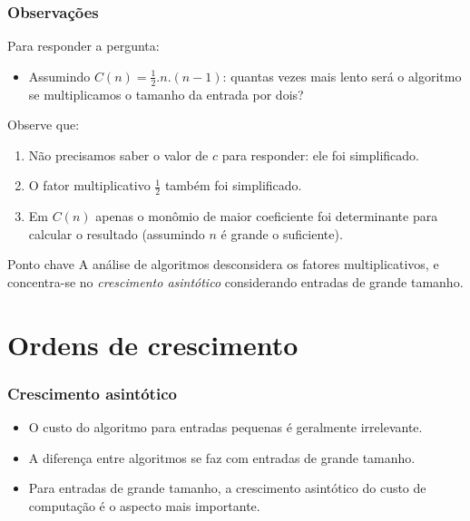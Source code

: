 \documentclass[handout]{beamer}
\begin{document}
\begin{frame}
  \frametitle{Observações}

  Para responder a pergunta:
  \begin{itemize}
  \item Assumindo $C(n) = \frac{1}{2}.n.(n-1)$: quantas vezes mais lento será o
    algoritmo se multiplicamos o tamanho da entrada por dois?
  \end{itemize}
  \pause
  Observe que:
  \begin{enumerate}
  \item Não precisamos saber o valor de $c$ para responder: ele foi
    simplificado.
  \item O fator multiplicativo $\frac{1}{2}$ também foi simplificado.
  \item Em $C(n)$ apenas o monômio de maior coeficiente foi determinante para
    calcular o resultado (assumindo $n$ é grande o suficiente).
  \end{enumerate}
  \begin{block}{Ponto chave}
    A análise de algoritmos desconsidera os fatores multiplicativos, e
    concentra-se no \emph{crescimento asintótico} considerando entradas de
    grande tamanho.
  \end{block}
\end{frame}

\section{Ordens de crescimento}

\begin{frame}
\frametitle{Crescimento asintótico}

\begin{itemize}
  \item O custo do algoritmo para entradas pequenas é geralmente irrelevante.
  \item A diferença entre algoritmos se faz com entradas de grande tamanho.
  \item Para entradas de grande tamanho, a crescimento asintótico do custo
    de computação é o aspecto mais importante.
\end{itemize}
\end{frame}
\end{document}
